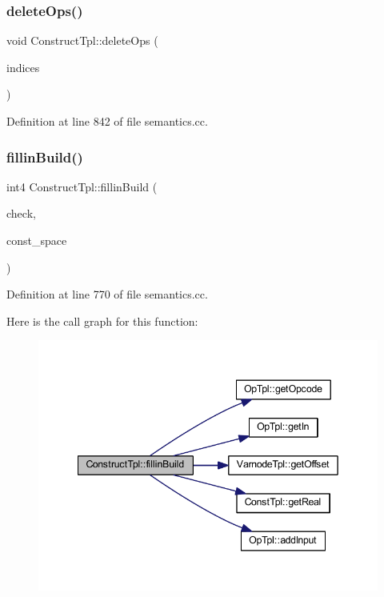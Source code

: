 \subsubsection{\texorpdfstring{deleteOps()}{deleteOps()}}
{\footnotesize\ttfamily void Construct\+Tpl\+::delete\+Ops (\begin{DoxyParamCaption}\item[{const vector$<$ int4 $>$ \&}]{indices }\end{DoxyParamCaption})}



Definition at line 842 of file semantics.\+cc.

\mbox{\label{class_construct_tpl_a917003d51923a5e694cc489ed5b96c06}} 
\subsubsection{\texorpdfstring{fillinBuild()}{fillinBuild()}}
{\footnotesize\ttfamily int4 Construct\+Tpl\+::fillin\+Build (\begin{DoxyParamCaption}\item[{vector$<$ int4 $>$ \&}]{check,  }\item[{\mbox{\hyperlink{class_addr_space}{Addr\+Space}} $\ast$}]{const\+\_\+space }\end{DoxyParamCaption})}



Definition at line 770 of file semantics.\+cc.

Here is the call graph for this function\+:
\nopagebreak
\begin{figure}[H]
\begin{center}
\leavevmode
\includegraphics[width=342pt]{class_construct_tpl_a917003d51923a5e694cc489ed5b96c06_cgraph}
\end{center}
\end{figure}
\mbox{\label{class_construct_tpl_acc7cf7bb955ba28c5e93c11e56fbd0ae}} 
